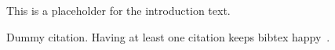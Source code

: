 This is a placeholder for the introduction text.

Dummy citation. Having at least one citation keeps bibtex
happy~\cite{Binkert-gem5-2011}.
